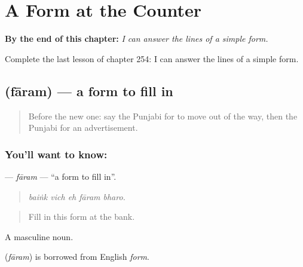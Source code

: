 
\chapter{A Form at the Counter}
\label{ch:pa-a2-a-form-at-the-counter}

\begin{chapteropening}
\textbf{By the end of this chapter:} \emph{I can answer the lines of a simple form.}

Complete the last lesson of chapter 254: I can answer the lines of a simple form.
\end{chapteropening}

\section[\texorpdfstring{\pa{ਫ਼ਾਰਮ} (fāram)}{ਫ਼ਾਰਮ (fāram)}]{ (fāram) — a form to fill in}

\label{lesson:PA-C254-faram}



\begin{quote}
Before the new one: say the Punjabi for to move out of the way, then the Punjabi for an advertisement.
\end{quote}

\subsection*{You'll want to know: }
\textbf{} — \emph{fāram} — \textquotedblleft{}a form to fill in\textquotedblright{}.

\begin{quote}
    
\end{quote}

\begin{quote}
\emph{baiṅk vich eh fāram bharo.}
\end{quote}

\begin{quote}
Fill in this form at the bank.
\end{quote}

A masculine noun.

\begin{cousinweb}
\textbf{} (\emph{fāram}) is borrowed from English \emph{form}.
\end{cousinweb}

